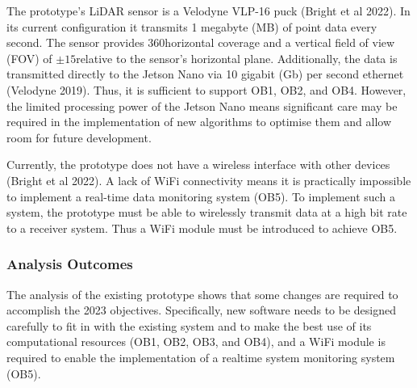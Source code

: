 The prototype's LiDAR sensor is a Velodyne VLP-16 puck (Bright et al 2022). In its current configuration it transmits 1 megabyte (MB) of point data every second. The sensor provides 360\textdegree\space horizontal coverage and a vertical field of view (FOV) of $\pm 15$\textdegree\space relative to the sensor's horizontal plane. Additionally, the data is transmitted directly to the Jetson Nano via 10 gigabit (Gb) per second ethernet (Velodyne 2019). Thus, it is sufficient to support OB1, OB2, and OB4. However, the limited processing power of the Jetson Nano means significant care may be required in the implementation of new algorithms to optimise them and allow room for future development. 

Currently, the prototype does not have a wireless interface with other devices (Bright et al 2022). A lack of WiFi connectivity means it is practically impossible to implement a real-time data monitoring system (OB5). To implement such a system, the prototype must be able to wirelessly transmit data at a high bit rate to a receiver system. Thus a WiFi module must be introduced to achieve OB5.

\subsubsection{Analysis Outcomes}
The analysis of the existing prototype shows that some changes are required to accomplish the 2023 objectives. Specifically, new software needs to be designed carefully to fit in with the existing system and to make the best use of its computational resources (OB1, OB2, OB3, and OB4), and a WiFi module is required to enable the implementation of a realtime system monitoring system (OB5).